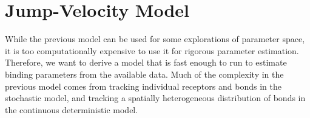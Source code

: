 
\chapter{Jump-Velocity Model}
\label{cha:jump-velocity-model}



While the previous model can be used for some explorations of
parameter space, it is too computationally expensive to use it for
rigorous parameter estimation. Therefore, we want to derive a model
that is fast enough to run to estimate binding parameters from the
available data. Much of the complexity in the previous model comes
from tracking individual receptors and bonds in the stochastic model,
and tracking a spatially heterogeneous distribution of bonds in the
continuous deterministic model.

